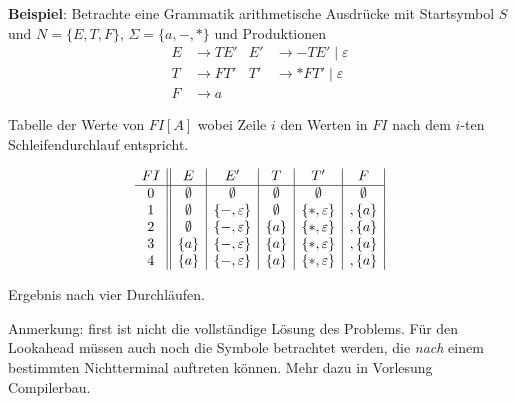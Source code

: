 {\textbf{Beispiel}: Betrachte eine  Grammatik arithmetische Ausdrücke
mit Startsymbol $S$ und $N = \{E, T, F\}$, $\Sigma = \{a, -, *\}$ und Produktionen
\begin{align*}
  E & \to T E' & E' & \to -T E' \mid \varepsilon \\
  T & \to F T' & T' & \to *F T' \mid \varepsilon \\
  F & \to a
\end{align*}

Tabelle der Werte von $FI[A]$ wobei Zeile $i$ den Werten in $FI$ nach
dem $i$-ten Schleifendurchlauf entspricht.

\begin{displaymath}
  \begin{array}{c||c|c|c|c|c|}
    FI & E & E' & T & T' & F \\\hline
    0  & \emptyset & \emptyset & \emptyset & \emptyset & \emptyset \\
    1  & \emptyset & \{ -, \varepsilon \} & \emptyset & \{ *, \varepsilon \} & , \{a\} \\
    2  & \emptyset & \{ -, \varepsilon \} & \{a\} & \{ *, \varepsilon \} & , \{a\} \\
    3  & \{a\} & \{ -, \varepsilon \} & \{a\} & \{ *, \varepsilon \} & , \{a\} \\
    4  & \{a\} & \{ -, \varepsilon \} & \{a\} & \{ *, \varepsilon \} & , \{a\} \\
  \end{array}
\end{displaymath}

Ergebnis nach vier Durchläufen. 

Anmerkung: first ist nicht die vollständige Lösung des Problems. Für
den Lookahead müssen auch noch die Symbole betrachtet werden, die
\emph{nach} einem bestimmten Nichtterminal auftreten können. Mehr dazu
in Vorlesung Compilerbau. 
}
